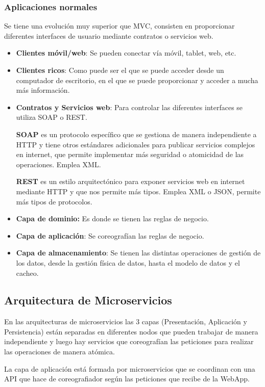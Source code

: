 \documentclass[12pt, twoside, openright]{report} %
\begin{document}
\subsubsection{Aplicaciones normales}

Se tiene una evolución muy superior que MVC, consisten en proporcionar diferentes interfaces de usuario mediante contratos o servicios web.

\begin{itemize}
	\item \textbf{Clientes móvil/web}: Se pueden conectar vía móvil, tablet, web, etc.
	\item \textbf{Clientes ricos}: Como puede ser el que se puede acceder desde un computador de escritorio, en el que se puede proporcionar y acceder a mucha más información.
	\item \textbf{Contratos y Servicios web}: Para controlar las diferentes interfaces se utiliza SOAP o REST.

	      \textbf{SOAP} es un protocolo específico que se gestiona de manera independiente a HTTP y tiene otros estándares adicionales para publicar servicios complejos en internet, que permite implementar más seguridad o atomicidad de las operaciones. Emplea XML.

	      \textbf{REST} es un estilo arquitectónico para exponer servicios web en internet mediante HTTP y que nos permite más tipos. Emplea XML o JSON, permite más tipos de protocolos.

	\item \textbf{Capa de dominio:} Es donde se tienen las reglas de negocio.
	\item \textbf{Capa de aplicación}: Se coreografían las reglas de negocio.
	\item \textbf{Capa de almacenamiento}: Se tienen las distintas operaciones de gestión de los datos, desde la gestión física de datos, hasta el modelo de datos y el cacheo.
\end{itemize}

\subsection{Arquitectura de Microservicios}
En las arquitecturas de microservicios las 3 capas (Presentación, Aplicación y Persistencia) están separadas en diferentes nodos que pueden trabajar de manera independiente y luego hay servicios que coreografían las peticiones para realizar las operaciones de manera atómica.

La capa de aplicación está formada por microservicios que se coordinan con una API que hace de coreografiador según las peticiones que recibe de la WebApp.
\end{document}
